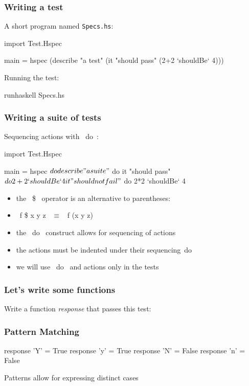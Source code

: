 \documentclass[11pt,xcolor={dvipsnames}]{beamer}
\newcommand{\tc}{\textcolor}
\newcommand{\key}[1]{\tc{orange}{#1}}
\newcommand{\rk}{\enskip{\key{$\hookleftarrow$}}}
\newcommand{\vs}{\vspace{1em}}
\begin{document}
\begin{frame}[fragile]
\frametitle{Writing a test}

A short program named \texttt{Specs.hs}:
\begin{haskell}[frame=single,caption=Specs.hs]
import Test.Hspec

main = hspec 
(describe "a test" 
 (it "should pass" 
  (2+2  `shouldBe` 4)))
\end{haskell}
\vs
Running the test:
\begin{term}
runhaskell Specs.hs\rk
\end{term}
\end{frame}
\begin{frame}[fragile]
\frametitle{Writing a suite of tests}
Sequencing actions with ~do~:
\begin{haskell}

import Test.Hspec

main = hspec $ do
    describe "a suite" $ do
        it "should pass" $ do
            2+2  `shouldBe` 4
        it "should not fail" $ do
            2*2 `shouldBe` 4
\end{haskell}
\begin{itemize}
\item the ~\$~ operator is an alternative to parentheses:
\item ~f \$ x y z~ $\equiv$ ~f (x y z)~
\item the ~do~ construct allows for sequencing of actions
\item the actions must be indented under their sequencing~do~ 
\item we will use ~do~ and actions only in the tests
\end{itemize}
\end{frame}
\begin{frame}[fragile]
\frametitle{Let's write some functions}
Write a function \emph{response} that passes this test:
\end{frame}
\begin{frame}[fragile]
\frametitle{Pattern Matching}
\begin{haskell}
response 'Y' = True
response 'y' = True
response 'N' = False
response 'n' = False
\end{haskell}
\vs
Patterns allow for expressing distinct cases 
\end{frame}
\end{document}
